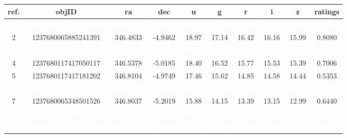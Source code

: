 \documentclass{aa}
\begin{document}
\begin{table}[!htb]
\centering
\begin{tabular}{cccccccccc}
\hline \hline
ref. & objID & ra & dec & u & g & r & i & z & ratings\\
\hline
\rowcolor[HTML]{D7261E}  \textcolor{white}{\textbf{1}} & \textcolor{white}{\textbf{1237680117417115692}} & \textcolor{white}{\textbf{346.7237}} & \textcolor{white}{\textbf{-5.0473}} & \textcolor{white}{\textbf{18.36}} & \textcolor{white}{\textbf{16.58}} & \textcolor{white}{\textbf{15.84}} & \textcolor{white}{\textbf{15.57}} & \textcolor{white}{\textbf{15.46}} & \textcolor{white}{\textbf{0.7345}}\\
2 & 1237680065885241391 & 346.4833 & -4.9462 & 18.97 & 17.14 & 16.42 & 16.16 & 15.99 & 0.8080\\
\rowcolor[HTML]{D7261E}  \textcolor{white}{\textbf{3}} & \textcolor{white}{\textbf{1237680117417115683}} & \textcolor{white}{\textbf{346.7128}} & \textcolor{white}{\textbf{-5.0499}} & \textcolor{white}{\textbf{17.59}} & \textcolor{white}{\textbf{15.78}} & \textcolor{white}{\textbf{15.11}} & \textcolor{white}{\textbf{14.87}} & \textcolor{white}{\textbf{14.80}} & \textcolor{white}{\textbf{0.3610}}\\
4 & 1237680117417050117 & 346.5378 & -5.0185 & 18.40 & 16.52 & 15.77 & 15.53 & 15.39 & 0.7006\\
5 & 1237680117417181202 & 346.8104 & -4.9749 & 17.46 & 15.62 & 14.85 & 14.58 & 14.44 & 0.5353\\
\rowcolor[HTML]{D7261E}  \textcolor{white}{\textbf{6}} & \textcolor{white}{\textbf{1237680065348435996}} & \textcolor{white}{\textbf{346.7072}} & \textcolor{white}{\textbf{-5.1987}} & \textcolor{white}{\textbf{16.70}} & \textcolor{white}{\textbf{14.70}} & \textcolor{white}{\textbf{13.90}} & \textcolor{white}{\textbf{13.68}} & \textcolor{white}{\textbf{13.52}} & \textcolor{white}{\textbf{0.3220}}\\
7 & 1237680065348501526 & 346.8037 & -5.2019 & 15.88 & 14.15 & 13.39 & 13.15 & 12.99 & 0.6440\\
\rowcolor[HTML]{D7261E}  \textcolor{white}{\textbf{8}} & \textcolor{white}{\textbf{1237680117417050120}} & \textcolor{white}{\textbf{346.5626}} & \textcolor{white}{\textbf{-5.1530}} & \textcolor{white}{\textbf{18.46}} & \textcolor{white}{\textbf{16.50}} & \textcolor{white}{\textbf{15.77}} & \textcolor{white}{\textbf{15.53}} & \textcolor{white}{\textbf{15.40}} & \textcolor{white}{\textbf{0.8298}}\\
\rowcolor[HTML]{0D4A05}  \textcolor{white}{\textbf{10}} & \textcolor{white}{\textbf{1237680117417115655}} & \textcolor{white}{\textbf{346.6500}} & \textcolor{white}{\textbf{-5.0393}} & \textcolor{white}{\textbf{17.20}} & \textcolor{white}{\textbf{15.38}} & \textcolor{white}{\textbf{14.65}} & \textcolor{white}{\textbf{14.40}} & \textcolor{white}{\textbf{14.28}} & \textcolor{white}{\textbf{1.0000}}\\

\end{tabular}
\end{table}
\end{document}
